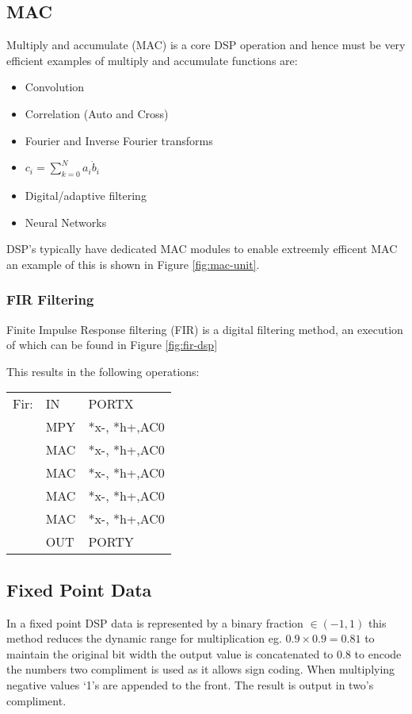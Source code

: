 \subsection{MAC}
Multiply and accumulate (MAC) is a core DSP operation and hence must be very efficient examples of
multiply and accumulate functions are:

\begin{itemize}
    \item Convolution
    \item Correlation (Auto and Cross)
    \item Fourier and Inverse Fourier transforms
    \item $c_{i}=\sum_{k=0}^{N}a_{i} \dot b_{i}$
    \item Digital/adaptive filtering
    \item Neural Networks
\end{itemize}

DSP's typically have dedicated MAC modules to enable extreemly efficent MAC an example of this is
shown in Figure \ref{fig:mac-unit}.



\subsubsection{FIR Filtering}
Finite Impulse Response filtering (FIR) is a digital filtering method, an execution of which can be
found in Figure \ref{fig:fir-dsp}



This results in the following operations:

\begin{center}
\begin{tabular} {l l l}
    Fir: & IN & PORTX\\
    & MPY & *x-, *h+,AC0\\
    & MAC & *x-, *h+,AC0\\
    & MAC & *x-, *h+,AC0\\
    & MAC & *x-, *h+,AC0\\
    & MAC & *x-, *h+,AC0\\
    & OUT & PORTY
\end{tabular}
\end{center}

\subsection{Fixed Point Data}
In a fixed point DSP data is represented by a binary fraction $\in (-1, 1)$ this method reduces the
dynamic range for multiplication eg. $0.9\times 0.9 = 0.81$ to maintain the original bit width the
output value is concatenated to $0.8$ to encode the numbers two compliment is used as it allows sign
coding. When multiplying negative values `1's are appended to the front. The result is output in
two's compliment.

